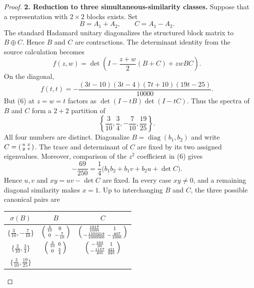 \documentclass[11pt]{article}
\begin{document}
\begin{proof}
\medskip
\noindent\textbf{2. Reduction to three simultaneous-similarity classes.}
Suppose that a representation with $2\times2$ blocks exists.  Set
\[
B=A_1+A_2,\qquad C=A_1-A_2.
\]
The standard Hadamard unitary diagonalizes the structured block matrix to $B\oplus C$.  Hence $B$ and $C$ are contractions.  The determinant identity from the source calculation becomes
\[
f(z,w)=\det\!\left(I-\frac{z+w}{2}(B+C)+zwBC\right). \tag{6}
\]
On the diagonal,
\[
f(t,t)=-\frac{(3t-10)(3t-4)(7t+10)(19t-25)}{10000}. \tag{7}
\]
But (6) at $z=w=t$ factors as $\det(I-tB)\det(I-tC)$.  Thus the spectra of $B$ and $C$ form a $2+2$ partition of
\[
\left\{\frac3{10},\frac34,-\frac7{10},\frac{19}{25}\right\}. \tag{8}
\]
All four numbers are distinct.  Diagonalize $B=\operatorname{diag}(b_1,b_2)$ and write $C=\begin{psmallmatrix}u&x\\y&v\end{psmallmatrix}$.  The trace and determinant of $C$ are fixed by its two assigned eigenvalues.  Moreover, comparison of the $z^2$ coefficient in (6) gives
\[
-\frac{69}{250}=\frac14\bigl(b_1b_2+b_1v+b_2u+\det C\bigr). \tag{9}
\]
Hence $u,v$ and $xy=uv-\det C$ are fixed.  In every case $xy\ne0$, and a remaining diagonal similarity makes $x=1$.  Up to interchanging $B$ and $C$, the three possible canonical pairs are
\begin{center}
\renewcommand{\arraystretch}{1.35}
\begin{tabular}{c c c}
\toprule
$\sigma(B)$ & $B$ & $C$\\
\midrule
$\{\frac3{10},-\frac7{10}\}$ &
$\begin{psmallmatrix}\frac3{10}&0\\0&-\frac7{10}\end{psmallmatrix}$ &
$\begin{psmallmatrix}\frac{1917}{1000}&1\\-\frac{1350219}{1000000}&-\frac{407}{1000}\end{psmallmatrix}$\\[5pt]
$\{\frac3{10},\frac34\}$ &
$\begin{psmallmatrix}\frac3{10}&0\\0&\frac34\end{psmallmatrix}$ &
$\begin{psmallmatrix}-\frac{163}{90}&1\\-\frac{1157}{405}&\frac{421}{225}\end{psmallmatrix}$\\[5pt]
$\{\frac3{10},\frac{19}{25}\}$ &

\end{tabular}
\end{center}
\end{proof}
\end{document}

